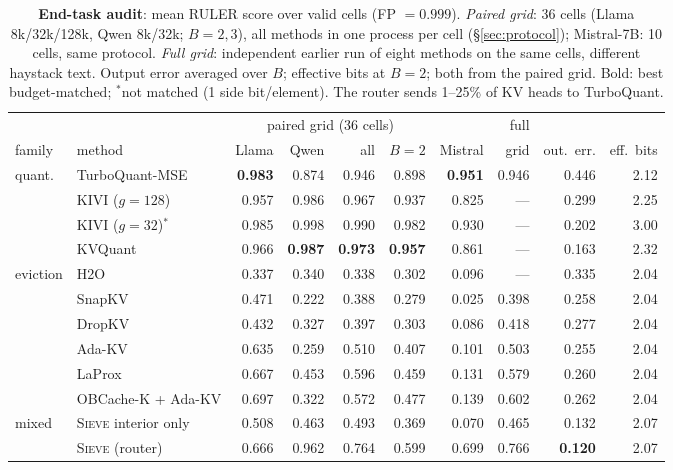 \documentclass{article}
\newcommand{\sieve}{\textsc{Sieve}}
\theoremstyle{definition}
\begin{document}
\begin{table}[t]
\centering
\footnotesize
\setlength{\tabcolsep}{2.6pt}
\caption{\textbf{End-task audit}: mean RULER score over valid cells (FP $=0.999$). \emph{Paired grid}: 36 cells (Llama 8k/32k/128k, Qwen 8k/32k; $B=2,3$), all methods in one process per cell (\S\ref{sec:protocol}); Mistral-7B: 10 cells, same protocol. \emph{Full grid}: independent earlier run of eight methods on the same cells, different haystack text. Output error averaged over $B$; effective bits at $B=2$; both from the paired grid. Bold: best budget-matched; $^\ast$not matched (1 side bit/element). The router sends 1--25\% of KV heads to TurboQuant.}
\label{tab:endtask}
\begin{tabular}{@{}llrrrrrrrr@{}}
\toprule
& & \multicolumn{4}{c}{paired grid (36 cells)} & & full & & \\
\cmidrule(lr){3-6}
family & method & Llama & Qwen & all & $B{=}2$ & Mistral & grid & out.\ err. & eff.\ bits \\
\midrule
\multirow{4}{*}{quant.} & TurboQuant-MSE & \textbf{0.983} & 0.874 & 0.946 & 0.898 & \textbf{0.951} & 0.946 & 0.446 & 2.12 \\
 & KIVI ($g{=}128$) & 0.957 & 0.986 & 0.967 & 0.937 & 0.825 & --- & 0.299 & 2.25 \\
 & KIVI ($g{=}32$)$^\ast$ & 0.985 & 0.998 & 0.990 & 0.982 & 0.930 & --- & 0.202 & 3.00 \\
 & KVQuant & 0.966 & \textbf{0.987} & \textbf{0.973} & \textbf{0.957} & 0.861 & --- & 0.163 & 2.32 \\
\midrule
\multirow{6}{*}{eviction} & H2O & 0.337 & 0.340 & 0.338 & 0.302 & 0.096 & --- & 0.335 & 2.04 \\
 & SnapKV & 0.471 & 0.222 & 0.388 & 0.279 & 0.025 & 0.398 & 0.258 & 2.04 \\
 & DropKV & 0.432 & 0.327 & 0.397 & 0.303 & 0.086 & 0.418 & 0.277 & 2.04 \\
 & Ada-KV & 0.635 & 0.259 & 0.510 & 0.407 & 0.101 & 0.503 & 0.255 & 2.04 \\
 & LaProx & 0.667 & 0.453 & 0.596 & 0.459 & 0.131 & 0.579 & 0.260 & 2.04 \\
 & OBCache-K + Ada-KV & 0.697 & 0.322 & 0.572 & 0.477 & 0.139 & 0.602 & 0.262 & 2.04 \\
\midrule
\multirow{2}{*}{mixed} & \sieve{} interior only & 0.508 & 0.463 & 0.493 & 0.369 & 0.070 & 0.465 & 0.132 & 2.07 \\
 & \sieve{} (router) & 0.666 & 0.962 & 0.764 & 0.599 & 0.699 & 0.766 & \textbf{0.120} & 2.07 \\
\bottomrule
\end{tabular}
\vspace{-2mm}
\end{table}
\end{document}
